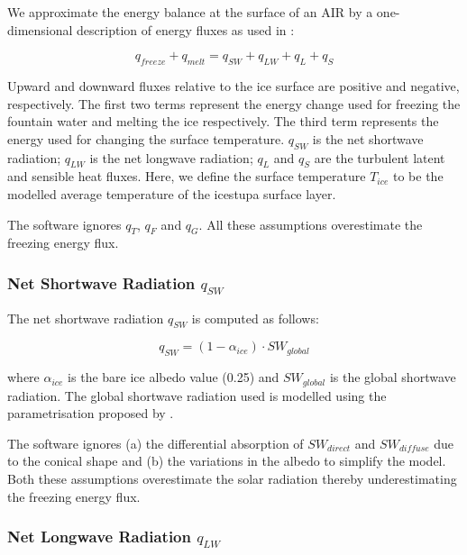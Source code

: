 \documentclass[utf8]{frontiersSCNS}
\begin{document}
We approximate the energy balance at the surface of an AIR by a one-dimensional description of energy fluxes as
used in \cite{Balasubramanian_2022}:

\begin{equation}
	 q_{freeze} + q_{melt} = q_{SW} + q_{LW} + q_{L} + q_{S}
	\label{eqn:EB}
\end{equation}

Upward and downward fluxes relative to the ice surface are positive and negative, respectively. The first two
terms represent the energy change used for freezing the fountain water and melting the ice respectively. The
third term represents the energy used for changing the surface temperature. $q_{SW}$ is the net shortwave
radiation; $q_{LW}$ is the net longwave radiation; $q_{L}$ and $q_{S}$ are the turbulent latent and sensible
heat fluxes.  Here, we define the surface temperature $T_{ice}$ to be the modelled average temperature of the
icestupa surface layer.

The software ignores $q_{T}$, $q_{F}$ and $q_{G}$. All these assumptions overestimate the freezing energy flux.

\subsubsection{Net Shortwave Radiation \texorpdfstring{$q_{SW}$}{Lg}} \label{sec:SW}

The net shortwave radiation $q_{SW}$ is computed as follows:

\begin{equation} q_{SW} = (1- \alpha_{ice})\cdot SW_{global} \label{eqn:SW} \end{equation}

where $\alpha_{ice}$ is the bare ice albedo value (0.25) and $SW_{global}$ is the global shortwave radiation.
The global shortwave radiation used is modelled using the parametrisation proposed by \cite{Woolf_1968}.

The software ignores (a) the differential absorption of $SW_{direct}$ and $SW_{diffuse}$ due to the conical
shape and (b) the variations in the albedo to simplify the model. Both these assumptions overestimate the solar
radiation thereby underestimating the freezing energy flux.

\subsubsection{Net Longwave Radiation \texorpdfstring{$q_{LW}$}{Lg}} \label{sec:LW}
\end{document}
